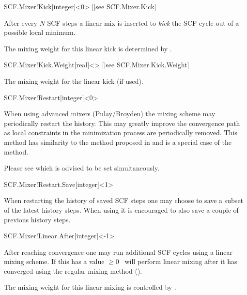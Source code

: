 \begin{fdfentry}{SCF.Mixer!Kick}[integer]<0>%
  [|see SCF.Mixer.Kick]

  After every $N$ SCF steps a linear mix is inserted to \emph{kick}
  the SCF cycle out of a possible local minimum. 

  The mixing weight for this linear kick is determined by .
  
\end{fdfentry}

\begin{fdfentry}{SCF.Mixer!Kick.Weight}[real]<>%
  [|see SCF.Mixer.Kick.Weight]

  The mixing weight for the linear kick (if used).
  
\end{fdfentry}



\begin{fdfentry}{SCF.Mixer!Restart}[integer]<0>

  When using advanced mixers (Pulay/Broyden) the mixing scheme may
  periodically restart the history. This may greatly improve the
  convergence path as local constraints in the minimization process
  are periodically removed. This method has similarity to the method
  proposed in \citet{Banerjee2016} and is a special case of the
   method.

  Please see  which is advised to be set
  simultaneously. 
  
\end{fdfentry}

\begin{fdfentry}{SCF.Mixer!Restart.Save}[integer]<1>

  When restarting the history of saved SCF steps one may choose to
  save a subset of the latest history steps.
  When using  it is encouraged to also save a
  couple of previous history steps.
  
\end{fdfentry}


\begin{fdfentry}{SCF.Mixer!Linear.After}[integer]<-1>

  After reaching convergence one may run additional SCF cycles using a
  linear mixing scheme. If this has a value $\ge 0$ \siesta\ will
  perform linear mixing after it has converged using the regular
  mixing method ().

  The mixing weight for this linear mixing is controlled by .

\end{fdfentry}



